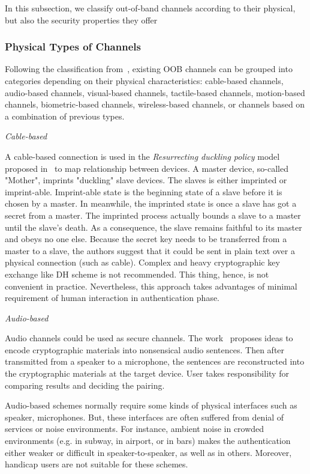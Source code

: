 In this subsection, we classify out-of-band channels according to their physical, but also the security properties they offer

\subsubsection{Physical Types of Channels}

Following the classification from~\cite{KhanPathanbook}, existing OOB channels can be grouped into categories depending on their  physical characteristics: cable-based channels, audio-based channels, visual-based channels, tactile-based channels, motion-based channels, biometric-based channels, wireless-based channels, or channels based on a combination of previous types.
 

\emph{Cable-based}

A cable-based connection is used in the \textit{Resurrecting duckling policy} model proposed in~\cite{Stajano:2000bs} to map relationship between devices. A master device, so-called "Mother", imprints "duckling" slave devices. The slaves is either imprinted or imprint-able. Imprint-able state is the beginning state of a slave before it is chosen by a master. In meanwhile, the imprinted state is once a slave has got a secret from a master. The imprinted process actually bounds a slave to a master until the slave's death. As a consequence, the slave remains faithful to its master and obeys no one else. Because the secret key needs to be transferred from a master to a slave, the authors suggest that it could be sent in plain text over a physical connection (such as cable). Complex and heavy cryptographic key exchange like DH scheme is not recommended. This thing, hence, is not convenient in practice. Nevertheless, this approach takes advantages of minimal requirement of human interaction in authentication phase.  

\emph{Audio-based}

Audio channels could be used as secure channels. The work~\cite{1648797, Soriente:2008, Lin:2011, Saxena:2008:UDP:1408664.1408672, 5678019, Sigg:2012aa} proposes ideas to encode cryptographic materials into nonsensical audio sentences. Then after transmitted from a speaker to a microphone, the sentences are reconstructed into the cryptographic materials at the target device. User takes responsibility for comparing results and deciding the pairing. 

Audio-based schemes normally require some kinds of physical interfaces such as speaker, microphones. But, these interfaces are often suffered from denial of services or noise environments. For instance, ambient noise in crowded environments (e.g. in subway, in airport, or in bars) makes the authentication either weaker or difficult in speaker-to-speaker, as well as in others. Moreover, handicap users are not suitable for these schemes. 


